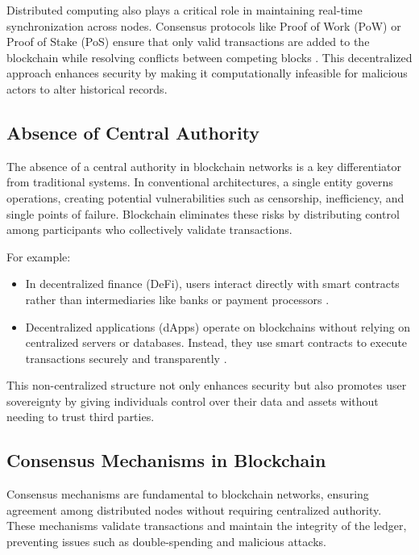 \documentclass{article}
\begin{document}
Distributed computing also plays a critical role in maintaining real-time synchronization across nodes. Consensus protocols like Proof of Work (PoW) or Proof of Stake (PoS) ensure that only valid transactions are added to the blockchain while resolving conflicts between competing blocks \cite{bonneau2015sok}. This decentralized approach enhances security by making it computationally infeasible for malicious actors to alter historical records.

\subsection*{Absence of Central Authority}
The absence of a central authority in blockchain networks is a key differentiator from traditional systems. In conventional architectures, a single entity governs operations, creating potential vulnerabilities such as censorship, inefficiency, and single points of failure. Blockchain eliminates these risks by distributing control among participants who collectively validate transactions.

For example:
\begin{itemize}
    \item In decentralized finance (DeFi), users interact directly with smart contracts rather than intermediaries like banks or payment processors \cite{defi2024}.
    \item Decentralized applications (dApps) operate on blockchains without relying on centralized servers or databases. Instead, they use smart contracts to execute transactions securely and transparently \cite{dapps2025}.
\end{itemize}

This non-centralized structure not only enhances security but also promotes user sovereignty by giving individuals control over their data and assets without needing to trust third parties.




\subsection{Consensus Mechanisms in Blockchain}

Consensus mechanisms are fundamental to blockchain networks, ensuring agreement among distributed nodes without requiring centralized authority. These mechanisms validate transactions and maintain the integrity of the ledger, preventing issues such as double-spending and malicious attacks.
\end{document}

